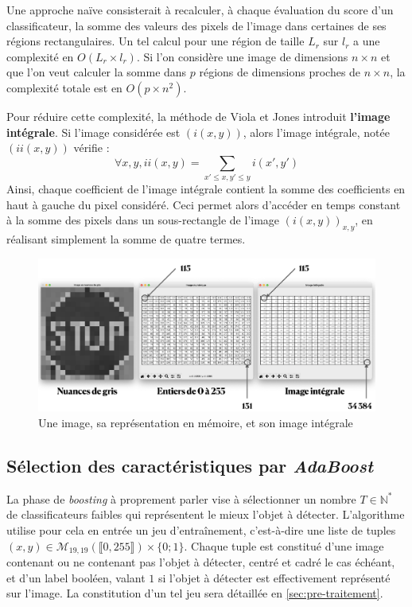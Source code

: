 \documentclass[12pt,a4paper]{article}
\begin{document}
Une approche naïve consisterait à recalculer, à chaque évaluation du score d'un classificateur, la somme des valeurs des pixels de l'image dans certaines de ses régions rectangulaires. Un tel calcul pour une région de taille $L_r$ sur $l_r$ a une complexité en $O(L_r \times l_r)$. Si l'on considère une image de dimensions $n \times n$ et que l'on veut calculer la somme dans $p$ régions de dimensions proches de $n \times n$, la complexité totale est en $O(p \times n^2)$.

Pour réduire cette complexité, la méthode de Viola et Jones introduit \textbf{l'image intégrale}. Si l'image considérée est $(i(x, y))$, alors l'image intégrale, notée $(ii(x, y))$ vérifie :
$$\forall x, y, ii(x, y) = \sum_{x' \leq x, y' \leq y} i(x', y')$$
Ainsi, chaque coefficient de l'image intégrale contient la somme des coefficients en haut à gauche du pixel considéré. Ceci permet alors d'accéder en temps constant à la somme des pixels dans un sous-rectangle de l'image $(i(x, y))_{x, y}$, en réalisant simplement la somme de quatre termes.

\begin{figure}[t]
    \includegraphics[scale = 0.35]{image_integrale}
    \centering
    \caption{Une image, sa représentation en mémoire, et son image intégrale}
\end{figure}


\subsection{Sélection des caractéristiques par \textit{AdaBoost}}
La phase de \textit{boosting} à proprement parler vise à sélectionner un nombre $T \in \mathbb{N}^*$ de classificateurs faibles qui représentent le mieux l'objet à détecter. L'algorithme utilise pour cela en entrée un jeu d'entraînement, c'est-à-dire une liste de tuples $(x, y) \in \mathcal{M}_{19, 19}(\llbracket 0, 255 \rrbracket) \times \{0 ; 1\}$. Chaque tuple est constitué d'une image contenant ou ne contenant pas l'objet à détecter, centré et cadré le cas échéant, et d'un label booléen, valant $1$ si l'objet à détecter est effectivement représenté sur l'image. La constitution d'un tel jeu sera détaillée en \ref{sec:pre-traitement}.
\end{document}
